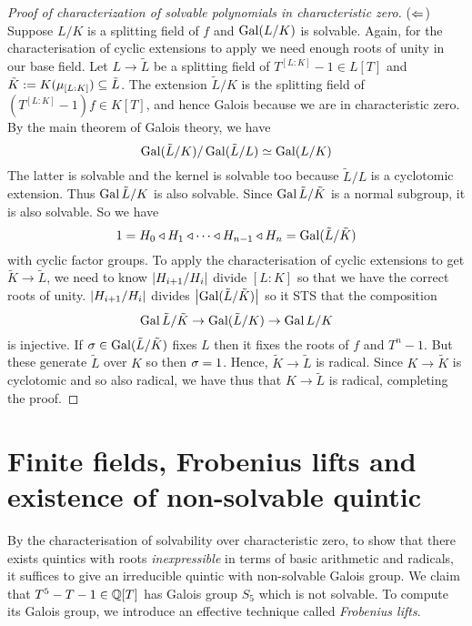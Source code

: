 \documentclass{article}
\begin{document}
\begin{proof}[Proof of characterization of solvable polynomials in characteristic zero]
  ($\Leftarrow$)
  Suppose $L / K$ is a splitting field of $f$ and
  $\operatorname{Gal}(L / K)$ is solvable.
  Again, for the characterisation of cyclic extensions to apply
  we need enough roots of unity in our base field.
  Let $L \to \tilde{L}$ be a splitting field of $T^{[L : K]} - 1 \in L[T]$
  and $\tilde{K} := K(\mu_{[L : K]}) \subseteq \tilde{L}$.
  The extension $\tilde{L} / K$ is the splitting field of
  $(T^{[L : K]} - 1) f \in K[T]$, and hence Galois because
  we are in characteristic zero.
  By the main theorem of Galois theory, we have \[
    \operatorname{Gal}(\tilde{L} / K) / \operatorname{Gal}(\tilde{L} / L) \simeq \operatorname{Gal}(L / K)
  \]
  The latter is solvable and the kernel is solvable too 
  because $\tilde{L} / L$ is a cyclotomic extension.
  Thus $\operatorname{Gal}{\tilde{L} / K}$ is also solvable.
  Since $\operatorname{Gal}{\tilde{L} / \tilde{K}}$ is a normal subgroup,
  it is also solvable.
  So we have
  \[
    1 = H_0 \triangleleft H_1 \triangleleft
    \cdots \triangleleft H_{n-1} \triangleleft H_n = \operatorname{Gal}(\tilde{L} / \tilde{K})
  \]
  with cyclic factor groups.
  To apply the characterisation of cyclic extensions
  to get $\tilde{K} \to \tilde{L}$,
  we need to know $\left\vert H_{i + 1} / H_i \right\vert$ divide $[L : K]$
  so that we have the correct roots of unity.
  $\left\vert H_{i + 1} / H_i \right\vert$ divides $\left\vert \operatorname{Gal}(\tilde{L} / \tilde{K}) \right\vert$
  so it STS that the composition 
  \[
    \operatorname{Gal}{\tilde{L} / \tilde{K}} \to \operatorname{Gal}(\tilde{L} / K) \to \operatorname{Gal}{L / K}
  \]
  is injective.
  If $\sigma \in \operatorname{Gal}(\tilde{L} / \tilde{K})$ fixes $L$
  then it fixes the roots of $f$ and $T^n - 1$.
  But these generate $\tilde{L}$ over $K$ so then $\sigma = 1$.
  Hence, $\tilde{K} \to \tilde{L}$ is radical.
  Since $K \to \tilde{K}$ is cyclotomic and so also radical,
  we have thus that $K \to \tilde{L}$ is radical, completing the proof.
\end{proof}

\section{Finite fields, Frobenius lifts and existence of non-solvable quintic}

By the characterisation of solvability over characteristic zero,
to show that there exists quintics with roots 
\emph{inexpressible} in terms of basic arithmetic and radicals,
it suffices to give an irreducible quintic with non-solvable Galois group.
We claim that $T^5 - T - 1 \in \mathbb{Q}[T]$ has Galois group $S_5$ 
which is not solvable.
To compute its Galois group, we introduce an effective technique
called \emph{Frobenius lifts}.
\end{document}
